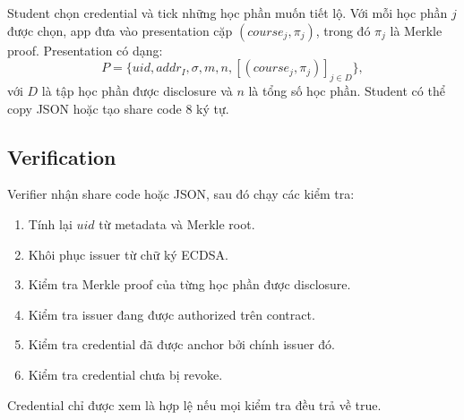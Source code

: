 Student chọn credential và tick những học phần muốn tiết lộ. Với mỗi học phần $j$ được chọn, app đưa vào presentation cặp $(course_j, \pi_j)$, trong đó $\pi_j$ là Merkle proof. Presentation có dạng:
\begin{equation}
  P = \{uid, addr_I, \sigma, m, n, [(course_j,\pi_j)]_{j \in D}\},
\end{equation}
với $D$ là tập học phần được disclosure và $n$ là tổng số học phần. Student có thể copy JSON hoặc tạo share code 8 ký tự.

\subsection{Verification}

Verifier nhận share code hoặc JSON, sau đó chạy các kiểm tra:
\begin{enumerate}[leftmargin=*]
  \item Tính lại $uid$ từ metadata và Merkle root.
  \item Khôi phục issuer từ chữ ký ECDSA.
  \item Kiểm tra Merkle proof của từng học phần được disclosure.
  \item Kiểm tra issuer đang được authorized trên contract.
  \item Kiểm tra credential đã được anchor bởi chính issuer đó.
  \item Kiểm tra credential chưa bị revoke.
\end{enumerate}
Credential chỉ được xem là hợp lệ nếu mọi kiểm tra đều trả về true.

